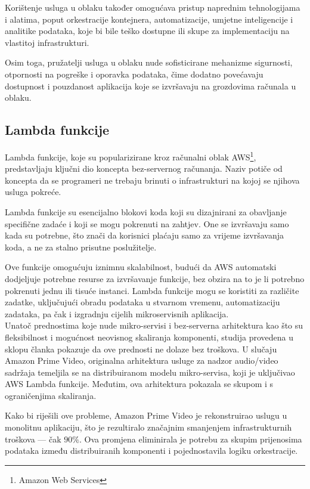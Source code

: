 \documentclass[times, utf8, diplomski]{fer}
\begin{document}
Korištenje usluga u oblaku također omogućava pristup naprednim tehnologijama i alatima, poput orkestracije kontejnera, automatizacije, umjetne inteligencije i analitike podataka, koje bi bile teško dostupne ili skupe za implementaciju na vlastitoj infrastrukturi.

Osim toga, pružatelji usluga u oblaku nude sofisticirane mehanizme sigurnosti, otpornosti na pogreške i oporavka podataka, čime dodatno povećavaju dostupnost i pouzdanost aplikacija koje se izvršavaju na grozdovima računala u oblaku.

\subsection{Lambda funkcije}

Lambda funkcije, koje su popularizirane kroz računalni oblak AWS\footnote{Amazon Web Services}, predstavljaju ključni dio koncepta bez-servernog  računanja. Naziv potiče od koncepta da se programeri ne trebaju brinuti o infrastrukturi na kojoj se njihova usluga pokreće.

Lambda funkcije su esencijalno blokovi koda koji su dizajnirani za obavljanje specifične zadaće i koji se mogu pokrenuti na zahtjev. One se izvršavaju samo kada su potrebne, što znači da korisnici plaćaju samo za vrijeme izvršavanja koda, a ne za stalno prisutne poslužitelje.

Ove funkcije omogućuju iznimnu skalabilnost, budući da AWS automatski dodjeljuje potrebne resurse za izvršavanje funkcije, bez obzira na to je li potrebno pokrenuti jednu ili tisuće instanci. Lambda funkcije mogu se koristiti za različite zadatke, uključujući obradu podataka u stvarnom vremenu, automatizaciju zadataka, pa čak i izgradnju cijelih mikroservisnih aplikacija. \\

Unatoč prednostima koje nude mikro-servisi i bez-serverna  arhitektura kao što su fleksibilnost i mogućnost neovisnog skaliranja komponenti, studija provedena u sklopu članka \citet{kolny_scaling_2023} pokazuje da ove prednosti ne dolaze bez troškova. U slučaju Amazon Prime Video, originalna arhitektura usluge za nadzor audio/video sadržaja temeljila se na distribuiranom modelu mikro-servisa, koji je uključivao AWS Lambda funkcije. Međutim, ova arhitektura pokazala se skupom i s ograničenjima skaliranja.

Kako bi riješili ove probleme, Amazon Prime Video je rekonstruirao uslugu u monolitnu aplikaciju, što je rezultiralo značajnim smanjenjem infrastrukturnih troškova --- čak \(90\%\). Ova promjena eliminirala je potrebu za skupim prijenosima podataka između distribuiranih komponenti i pojednostavila logiku orkestracije.
\end{document}
